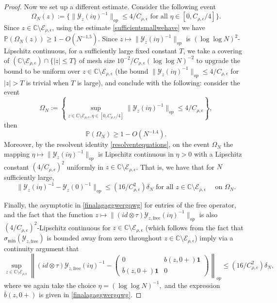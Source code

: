\documentclass[11pt,reqno]{amsart}
\theoremstyle{plain}
\theoremstyle{remark}
\numberwithin{equation}{section}
\begin{document}
\begin{proof}
Now we set up a different estimate.
Consider the following event $$\Omega_N(z):=\{\|\mathcal{Y}_z(i\eta)^{-1}\|_{op}\leq 4/C_{\rho,\epsilon}\text{ for all } \eta\in[0,C_{\rho,\epsilon}/4]\}.$$ Since $z\in\mathbb{C}\setminus\mathcal{E}_{\rho,\epsilon}$, using the estimate \eqref{sufficientsmallwehave} we have $\mathbb{P}(\Omega_N(z))\geq 1-O(N^{-1.5})$. Since $z\mapsto \|\mathcal{Y}_z(i\eta)^{-1}\|_{op}$ is $(\log\log N)^2$-Lipschitz continuous, for a sufficiently large fixed constant $T$, we take a covering of $(\mathbb{C}\setminus\mathcal{E}_{\rho,\epsilon})\cap\{|z|\leq T\}$ of mesh size $10^{-2}/C_{\rho,\epsilon}(\log\log N)^{-2}$  to upgrade the bound to be uniform over $z\in \mathbb{C}\setminus\mathcal{E}_{\rho,\epsilon}$ (the bound $\|\mathcal{Y}_z(i\eta)^{-1}\|_{op}\leq 4/C_{\rho,\epsilon}$ for $|z|>T$ is trivial when $T$ is large), and conclude with the following: consider the event
$$\Omega_N:=\left\{\sup_{z\in\mathbb{C}\setminus\mathcal{E}_{\rho,\epsilon},\eta\in[0,C_{\rho,\epsilon}/4]}\|\mathcal{Y}_z(i\eta)^{-1}\|_{op}\leq 4/C_{\rho,\epsilon}\right\},$$
then $$\mathbb{P}(\Omega_N)\geq 1-O(N^{-1.4}).$$ Moreover, by the resolvent identity \eqref{resolventequations}, on the event $\Omega_N$ the mapping $\eta\mapsto \|\mathcal{Y}_z(i\eta)^{-1}\|_{op}$ is Lipschitz continuous in $\eta>0$ with a Lipschitz constant $(4/C_{\rho,\epsilon})^2$ uniformly in $z\in\mathbb{C}\setminus\mathcal{E}_{\rho,\epsilon}$. That is, we have that for $N$ sufficiently large,
\begin{equation}\label{Lipschotzcontomegan}
    \|\mathcal{Y}_z(i\eta)^{-1}-\mathcal{Y}_z(0)^{-1}\|_{op}\leq (16/C_{\rho,\epsilon}^2)\delta_N\text{ for all }z\in\mathbb{C}\setminus\mathcal{E}_{\rho,\epsilon}\quad\text{ on }\Omega_N.
\end{equation}

Finally, the asymptotic in \eqref{finalagaggwergqwg} for entries of the free operator, and the fact that the function $z\mapsto \|(id\otimes\tau)\mathcal{Y}_{z,\text{free}}(i\eta)^{-1}\|_{op}$
is also $(4/C_{\rho,\epsilon})^2$-Lipschitz continuous for $z\in\mathbb{C}\setminus\mathcal{E}_{\rho,\epsilon}$ (which follows from the fact that $\sigma_{\min}(\mathcal{Y}_{z,\text{free}})$ is bounded away from zero throughout $z\in\mathbb{C}\setminus\mathcal{E}_{\rho,\epsilon}$) imply via a continuity argument that
\begin{equation}\label{line765567765667}
\sup_{z\in\mathbb{C}\setminus\mathcal{E}_{\rho,\epsilon}} \left\|(id\otimes\tau)\mathcal{Y}_{z,\text{free}}(i\eta)^{-1}
-\begin{pmatrix}
    0&b(z,0+)\mathbf{1}\\\bar{b}(z,0+)\mathbf{1}&0
\end{pmatrix}\right\|_{op}\leq(16/C_{\rho,\epsilon}^2)\delta_N,
\end{equation} where we again take the choice $\eta=(\log \log N)^{-1},$ and the expression $\bar{b}(z,0+)$ is given in \eqref{finalagaggwergqwg}.


\end{proof}
\end{document}
